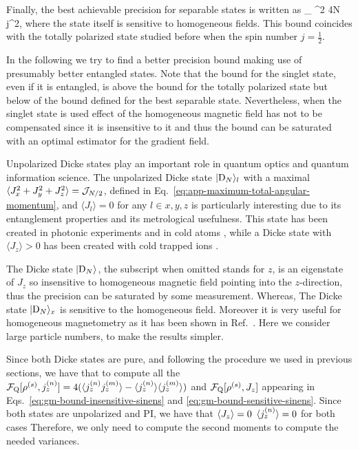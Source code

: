 Finally, the best achievable precision for separable states is written as
\be
  _{} \leqslant  \sigma^2 4N j^2,
  \label{eq:gm-best_separable}
\ee
where the state itself is sensitive to homogeneous fields.
This bound coincides with the totally polarized state studied before when the spin number $j=\frac{1}{2}$.

In the following we try to find a better precision bound making use of presumably better entangled states.
Note that the bound for the singlet state, even if it is entangled, is above the bound for the totally polarized state but below of the bound defined for the best separable state.
Nevertheless, when the singlet state is used effect of the homogeneous magnetic field has not to be compensated since it is insensitive to it and thus the bound can be saturated with an optimal estimator for the gradient field.


Unpolarized Dicke states play an important role in quantum optics and quantum information science.
The unpolarized Dicke state $\vert{\ensuremath{\textnormal{D}_{N}}}\rangle_l$ with a maximal $\langle{J_x^2+J_y^2+J_z^2}\rangle=\mathcal{J}_{N/2}$, defined in Eq.~\eqref{eq:app-maximum-total-angular-momentum}, and $\langle J_l\rangle=0$ for any $l\in x,y,z$ is particularly interesting due to its entanglement properties and its metrological usefulness.
This state has been created in photonic experiments \cite{Kiesel2007,Wieczorek2009,Chiuri2012} and in cold atoms \cite{Luecke2011,Hamley2012}, while a Dicke state with $\langle J_z\rangle>0$ has been created with cold trapped ions \cite{haeffner2005}.

The Dicke state $\vert{\ensuremath{\textnormal{D}_{N}}}\rangle$, the subscript when omitted stands for $z$,  is an eigenstate of $J_z$ so insensitive to homogeneous magnetic field pointing into the $z$-direction, thus the precision can be saturated by some measurement.
Whereas, The Dicke state $\vert{\ensuremath{\textnormal{D}_{N}}}\rangle_x$ is sensitive to the homogeneous field.
Moreover it is very useful for homogeneous magnetometry as it has been shown in Ref.~\cite{Holland1993}.
Here we consider large particle numbers, to make the results simpler.

Since both Dicke states are pure, and following the procedure we used in previous sections, we have that to compute all the $\mathcal{F}_{\textnormal{Q}}[{\textstyle \rho^{(s)},j_z^{(n)}}]=4(\langle{j_z^{(n)}j_z^{(m)}}\rangle-\langle{j_z^{(n)}}\rangle\langle{j_z^{(m)}}\rangle)$ and $\mathcal{F}_{\textnormal{Q}}[{\textstyle \rho^{(s)},J_z}]$ appearing in Eqs.~\eqref{eq:gm-bound-insensitive-sinens} and \eqref{eq:gm-bound-sensitive-sinens}.
Since both states are unpolarized and PI, we have that $\langle{J_z}\rangle=0$ $\langle{j_z^{(n)}}\rangle=0$ for both cases
Therefore, we only need to compute the second moments to compute the needed variances.

